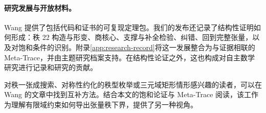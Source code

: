 \paragraph{研究发展与开放材料。}
Wang 提供了包括代码和证书的可复现定理包。我们的发布还记录了结构性证明如何形成：秩 22 构造与形变、商核心、支撑与补全检验、纠错、回到完整张量，以及对饱和条件的识别。附录\ref{app:research-record}将这一发展整合为与证据相联的 Meta-Trace，并由主题研究档案支持。在结构性论证之外，这也构成对自主数学研究进行记录和研究的贡献。

对秩一张成搜索、对称性约化的秩型枚举或三元域矩形情形感兴趣的读者，可以在 Wang 的文章\cite{wang2026twentyone}中找到互补方法。结合本文的饱和论证与 Meta-Trace 阅读，该工作为理解有限域约束如何导出张量秩下界，提供了另一种视角。
